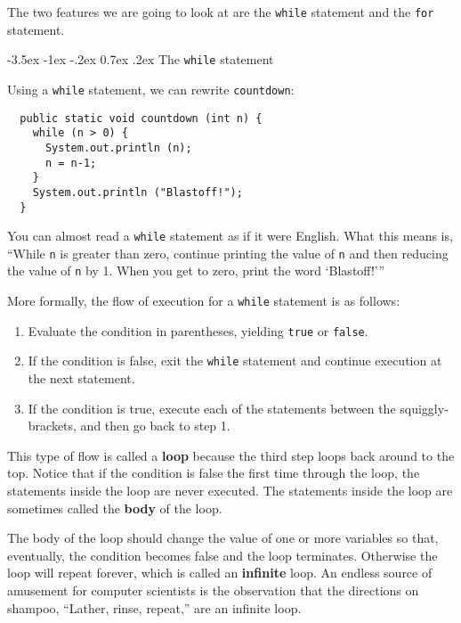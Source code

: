 \documentclass{book}
\makeatletter
\renewcommand{\section}{\@startsection 
    {section} {1} {0mm}%
    {-3.5ex \@plus -1ex \@minus -.2ex}%
    {0.7ex \@plus.2ex}%
    {\normalfont\Large\bfseries}}
\makeatother
\begin{document}
The two features we are going to look at are the {\tt while}
statement and the {\tt for} statement.

\section{The {\tt while} statement}

Using a {\tt while} statement, we can rewrite {\tt countdown}:

\begin{verbatim}
  public static void countdown (int n) {
    while (n > 0) {
      System.out.println (n);
      n = n-1;
    }
    System.out.println ("Blastoff!");
  }
\end{verbatim}
%
You can almost read a {\tt while} statement as if it were
English.  What this means is, ``While {\tt n} is greater than
zero, continue printing the value of {\tt n} and then reducing
the value of {\tt n} by 1.  When you get to zero, print the
word `Blastoff!'''

More formally, the flow of execution for a {\tt while} statement
is as follows:

\begin{enumerate}

\item Evaluate the condition in parentheses, yielding {\tt true}
or {\tt false}.

\item If the condition is false, exit the {\tt while} statement
and continue execution at the next statement.

\item If the condition is true, execute each of the statements
between the squiggly-brackets, and then go back to step 1.

\end{enumerate}

This type of flow is called a {\bf loop} because the third step loops
back around to the top.  Notice that if the condition is false the
first time through the loop, the statements inside the loop are
never executed.  The statements inside the loop are sometimes called
the {\bf body} of the loop.


The body of the loop should change the value of
one or more variables so that, eventually, the condition becomes
false and the loop terminates.  Otherwise the loop will repeat
forever, which is called an {\bf infinite} loop.  An endless
source of amusement for computer scientists is the observation
that the directions on shampoo, ``Lather, rinse, repeat,'' are
an infinite loop.
\end{document}
